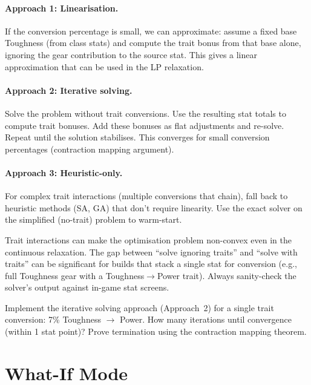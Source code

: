 \documentclass[11pt, a4paper, oneside]{book}
\begin{document}
\paragraph{Approach 1: Linearisation.}
If the conversion percentage is small, we can approximate: assume a fixed
base Toughness (from class stats) and compute the trait bonus from that base
alone, ignoring the gear contribution to the source stat.  This gives a
linear approximation that can be used in the LP relaxation.

\paragraph{Approach 2: Iterative solving.}
Solve the problem without trait conversions.  Use the resulting stat totals
to compute trait bonuses.  Add these bonuses as flat adjustments and re-solve.
Repeat until the solution stabilises.  This converges for small conversion
percentages (contraction mapping argument).

\paragraph{Approach 3: Heuristic-only.}
For complex trait interactions (multiple conversions that chain), fall back
to heuristic methods (SA, GA) that don't require linearity.  Use the exact
solver on the simplified (no-trait) problem to warm-start.

\begin{warningbox}
Trait interactions can make the optimisation problem non-convex even in the
continuous relaxation.  The gap between ``solve ignoring traits'' and ``solve
with traits'' can be significant for builds that stack a single stat for
conversion (e.g., full Toughness gear with a Toughness$\to$Power trait).
Always sanity-check the solver's output against in-game stat screens.
\end{warningbox}

\begin{exercisebox}
Implement the iterative solving approach (Approach~2) for a single trait
conversion: 7\% Toughness $\to$ Power.  How many iterations until convergence
(within 1 stat point)?  Prove termination using the contraction mapping theorem.
\end{exercisebox}

\section{What-If Mode}
\end{document}
